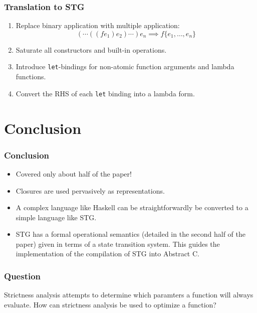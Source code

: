 \documentclass{beamer}
\begin{document}
\begin{frame}
    \frametitle{Translation to STG}

    \begin{enumerate}
        \item Replace binary application with multiple application:
            \begin{equation*}
                (\cdots((f e_1) e_2)\cdots) e_n
                \implies f \{ e_1, \ldots, e_n \}
            \end{equation*}

        \item Saturate all constructors and built-in operations.

        \item Introduce \texttt{let}-bindings for non-atomic function arguments
            and lambda functions.

        \item Convert the RHS of each \texttt{let} binding into a lambda form.
    \end{enumerate}
\end{frame}

\section{Conclusion}

\begin{frame}
    \frametitle{Conclusion}

    \begin{itemize}
        \item Covered only about half of the paper!

        \item Closures are used pervasively as representations.

        \item A complex language like Haskell can be straightforwardly be converted
            to a simple language like STG.

        \item STG has a formal operational semantics (detailed in the second half
            of the paper) given in terms of a state transition system. This guides
            the implementation of the compilation of STG into Abstract C.
    \end{itemize}
\end{frame}

\begin{frame}
    \frametitle{Question}

    \alert{Strictness analysis} attempts to determine which paramters a
    function will always evaluate. How can strictness analysis be used to
    optimize a function?
\end{frame}
\end{document}
